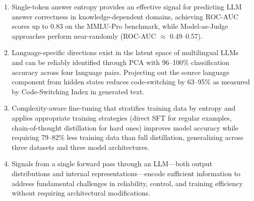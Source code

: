 \begin{enumerate}
  \item Single-token answer entropy provides an effective signal for predicting LLM answer correctness in knowledge-dependent domains, achieving ROC-AUC scores up to 0.83 on the MMLU-Pro benchmark, while Model-as-Judge approaches perform near-randomly (ROC-AUC $\approx$ 0.49--0.57).

  \item Language-specific directions exist in the latent space of multilingual LLMs and can be reliably identified through PCA with 96--100\% classification accuracy across four language pairs. Projecting out the source language component from hidden states reduces code-switching by 63--95\% as measured by Code-Switching Index in generated text.

  \item Complexity-aware fine-tuning that stratifies training data by entropy and applies appropriate training strategies (direct SFT for regular examples, chain-of-thought distillation for hard ones) improves model accuracy while requiring 79--82\% less training data than full distillation, generalizing across three datasets and three model architectures.

  \item Signals from a single forward pass through an LLM---both output distributions and internal representations---encode sufficient information to address fundamental challenges in reliability, control, and training efficiency without requiring architectural modifications.
\end{enumerate}
